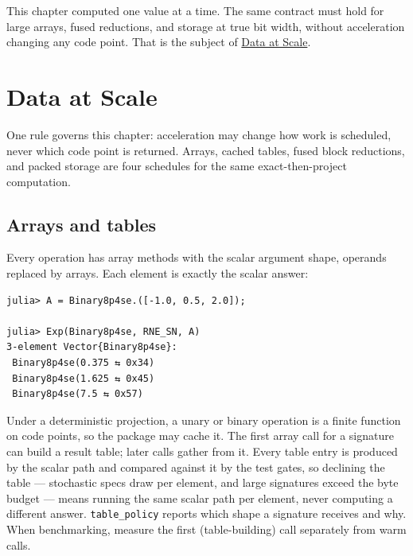 \label{9862256287407127426-dup1}{}


This chapter computed one value at a time. The same contract must hold for large arrays, fused reductions, and storage at true bit width, without acceleration changing any code point. That is the subject of \href{data.md}{Data at Scale}.





\chapter{Data at Scale}



\label{15729904777561585153}{}


One rule governs this chapter: acceleration may change how work is scheduled, never which code point is returned. Arrays, cached tables, fused block reductions, and packed storage are four schedules for the same exact-then-project computation.



\section{Arrays and tables}



\label{4990902378038015438}{}


Every operation has array methods with the scalar argument shape, operands replaced by arrays. Each element is exactly the scalar answer:




\nopagebreak[4]
\begin{verbatim}
julia> A = Binary8p4se.([-1.0, 0.5, 2.0]);

julia> Exp(Binary8p4se, RNE_SN, A)
3-element Vector{Binary8p4se}:
 Binary8p4se(0.375 ⇆ 0x34)
 Binary8p4se(1.625 ⇆ 0x45)
 Binary8p4se(7.5 ⇆ 0x57)
\end{verbatim}



Under a deterministic projection, a unary or binary operation is a finite function on code points, so the package may cache it. The first array call for a signature can build a result table; later calls gather from it. Every table entry is produced by the scalar path and compared against it by the test gates, so declining the table — stochastic specs draw per element, and large signatures exceed the byte budget — means running the same scalar path per element, never computing a different answer. \texttt{table\_\allowbreak{}policy} reports which shape a signature receives and why. When benchmarking, measure the first (table-building) call separately from warm calls.



